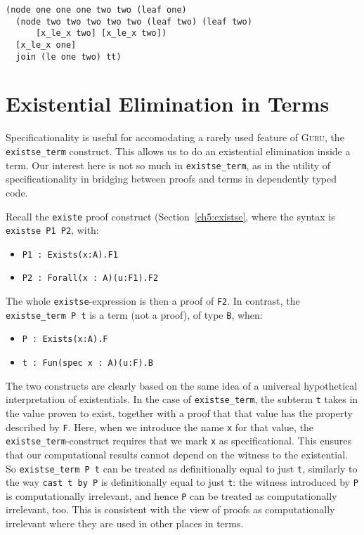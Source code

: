 \documentclass{book}[12pt]
\newcommand{\guru}[0]{\textsc{Guru}\xspace}
\begin{document}
\begin{verbatim}
(node one one one two two (leaf one)
  (node two two two two two (leaf two) (leaf two) 
      [x_le_x two] [x_le_x two])
  [x_le_x one]
  join (le one two) tt)
\end{verbatim}

\section{Existential Elimination in Terms}

Specificationality is useful for accomodating a rarely used feature of
\guru, the \texttt{existse\_term} construct.  This allows us to do an
existential elimination inside a term.  Our interest here is not so
much in \texttt{existse\_term}, as in the utility of
specificationality in bridging between proofs and terms in dependently
typed code.  

Recall the \texttt{existe} proof construct (Section~\ref{ch5:existse},
where the syntax is \texttt{existse P1 P2}, with:

\begin{itemize}
\item \texttt{P1 : Exists(x:A).F1}
\item \texttt{P2 : Forall(x : A)(u:F1).F2}
\end{itemize}

\noindent The whole \texttt{existse}-expression is then a proof of
\texttt{F2}.  In contrast, the \texttt{existse\_term P t} is a term
(not a proof), of type \texttt{B}, when:

\begin{itemize}
\item \texttt{P : Exists(x:A).F}
\item \texttt{t : Fun(spec x : A)(u:F).B}
\end{itemize}

\noindent The two constructs are clearly based on the same idea of a
universal hypothetical interpretation of existentials.  In the case of
\texttt{existse\_term}, the subterm \texttt{t} takes in the value
proven to exist, together with a proof that that value has the
property described by \texttt{F}.  Here, when we introduce the name
\texttt{x} for that value, the \texttt{existse\_term}-construct
requires that we mark \texttt{x} as specificational.  This ensures
that our computational results cannot depend on the witness to the
existential.  So \texttt{existse\_term P t} can be treated as
definitionally equal to just \texttt{t}, similarly to the way
\texttt{cast t by P} is definitionally equal to just \texttt{t}: the
witness introduced by \texttt{P} is computationally irrelevant, and
hence \texttt{P} can be treated as computationally irrelevant, too.
This is consistent with the view of proofs as computationally
irrelevant where they are used in other places in terms.
\end{document}
